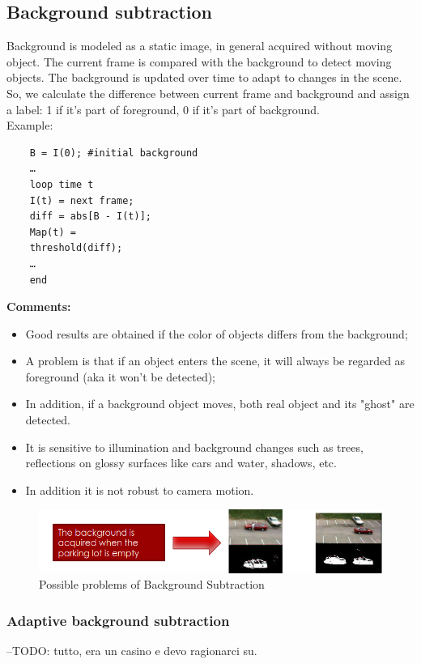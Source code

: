 \subsection{Background subtraction}
Background is modeled as a static image, in general acquired without moving object. The current frame is compared with the background to detect moving objects. The background is updated over time to adapt to changes in the scene.
So, we calculate the difference between current frame and background and assign a label: 1 if it's part of foreground, 0 if it's part of background. 
\\Example: 
\begin{verbatim}
    B = I(0); #initial background
    …
    loop time t
    I(t) = next frame;
    diff = abs[B - I(t)];
    Map(t) =
    threshold(diff);
    …
    end
\end{verbatim} 
\textbf{Comments:}
\begin{itemize}
    \item Good results are obtained if the color of objects differs from the background;
    \item A problem is that if an object enters the scene, it will always be regarded as foreground (aka it won't be detected);
    \item In addition, if a background object moves, both real object and its "ghost" are detected.
    \item It is sensitive to illumination and background changes such as trees, reflections on glossy surfaces like cars and water, shadows, etc.
    \item In addition it is not robust to camera motion.
\end{itemize}
\begin{figure}[h]
    \centering
    \includegraphics[scale=0.4]{Figures/BackgroundSub.png}
    \caption{Possible problems of Background Subtraction}
\end{figure}
\subsubsection{Adaptive background subtraction}
--TODO: tutto, era un casino e devo ragionarci su.
